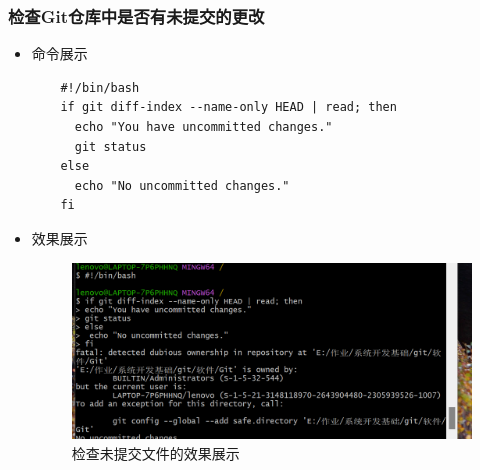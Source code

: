 \documentclass[UTF8]{ctexart}
\begin{document}
\subsubsection{检查Git仓库中是否有未提交的更改}
\begin{itemize}
  \item 命令展示
  \begin{verbatim}
    #!/bin/bash
    if git diff-index --name-only HEAD | read; then
      echo "You have uncommitted changes."
      git status
    else
      echo "No uncommitted changes."
    fi
  \end{verbatim}

  \item 效果展示
  \begin{figure}[H]
    \centering
    \includegraphics[width=\textwidth]{24} %
    \caption{检查未提交文件的效果展示}
    \label{fig:uncommitted-changes}
  \end{figure}
\end{itemize}
\end{document}
